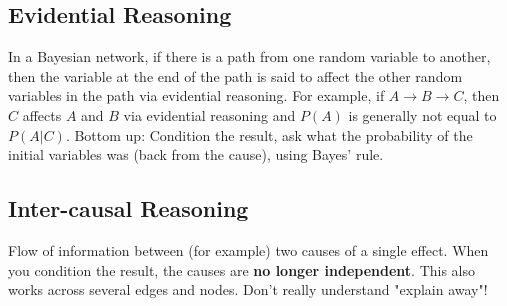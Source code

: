 \subsection{Evidential Reasoning}
In a Bayesian network, if there is a path from one random variable to another, then the variable at the end of the path is said to affect the other random variables in the path via evidential reasoning. For example, if $A \rightarrow B \rightarrow C$, then $C$ affects $A$ and $B$ via evidential reasoning and $P(A)$ is generally not equal to $P(A|C)$.
Bottom up: Condition the result, ask what the probability of the initial variables was (back from the cause), using Bayes' rule.

\subsection{Inter-causal Reasoning}
Flow of information between (for example) two causes of a single effect. When you condition the result, the causes are \textbf{no longer independent}. This also works across several edges and nodes. Don't really understand "explain away"! 
